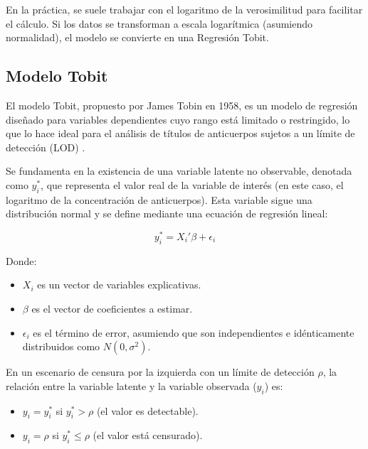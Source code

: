En la práctica, se suele trabajar con el logaritmo de la verosimilitud para facilitar el cálculo. Si los datos se transforman a escala logarítmica (asumiendo normalidad), el modelo se convierte en una Regresión Tobit.

\subsection{Modelo Tobit}\label{sec:Modelo_Tobit}

El modelo Tobit, propuesto por James Tobin en 1958, es un modelo de regresión diseñado para variables dependientes cuyo rango está limitado o restringido, lo que lo hace ideal para el análisis de títulos de anticuerpos sujetos a un límite de detección (LOD) \cite{tobit_survey,tobit_original}.

\begin{definition}
	
	Se fundamenta en la existencia de una variable latente no observable, denotada como $y_i^*$, que representa el valor real de la variable de interés (en este caso, el logaritmo de la concentración de anticuerpos). Esta variable sigue una distribución normal y se define mediante una ecuación de regresión lineal\cite{tobit_survey,tobit_original}:
	
	\begin{equation}
		y_i^* = X_i' \beta + \epsilon_i
		\label{eq:tobit_latente}
	\end{equation}
	
	Donde:
	\begin{itemize}
		\item $X_i$ es un vector de variables explicativas.
		\item $\beta$ es el vector de coeficientes a estimar.
		\item $\epsilon_i$ es el término de error, asumiendo que son independientes e idénticamente distribuidos como $N(0, \sigma^2)$.
	\end{itemize}
	
	En un escenario de censura por la izquierda con un límite de detección $\rho$, la relación entre la variable latente y la variable observada ($y_i$) es:
	
	\begin{itemize}
		\item $y_i = y_i^*$ si $y_i^* > \rho$ (el valor es detectable).
		\item $y_i = \rho$ si $y_i^* \le \rho$ (el valor está censurado).
	\end{itemize}
\end{definition}

